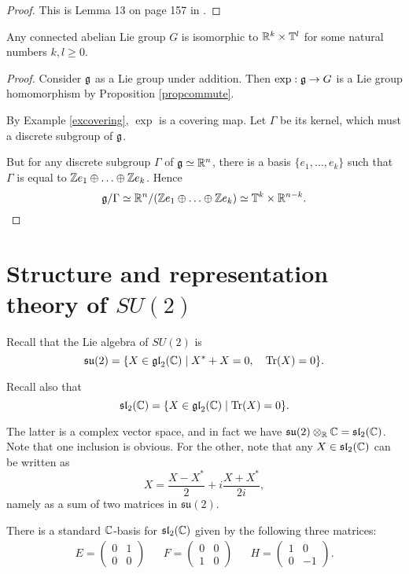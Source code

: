 \documentclass[11pt, english]{article}
\begin{document}
\begin{proof}
This is Lemma 13 on page 157 in \cite{spivak_manifolds}.
\end{proof}

\begin{prop}
\label{propabelian}
  Any connected abelian Lie group $G$ is isomorphic to $\mathbb{R}^k \times \mathbb T^l$ for some natural numbers $k,l \geq 0$.
\end{prop}

\begin{proof}
 Consider $\mathfrak g$ as a Lie group under addition. Then $\exp:\mathfrak g \to G$ is a Lie group homomorphism by Proposition \ref{propcommute}.

By Example \ref{excovering}, $\exp$ is a covering map. Let $\Gamma$ be its kernel, which must a discrete subgroup of $\mathfrak g$. 

But for any discrete subgroup $\Gamma$ of $\mathfrak g \simeq \mathbb{R}^n$, there is a basis $\{e_1,\ldots,e_k \}$ such that $\Gamma$ is equal to $\mathbb{Z} e_1 \oplus \ldots \oplus \mathbb{Z} e_k$. Hence
$$
\mathfrak g / \Gamma \simeq \mathbb{R}^n/(\mathbb{Z} e_1 \oplus \ldots \oplus \mathbb{Z} e_k) \simeq \mathbb T^k \times \mathbb{R}^{n-k}.
$$
\end{proof}



\newpage
\section{Structure and representation theory of $SU(2)$}

Recall that the Lie algebra of $SU(2)$ is
$$
\mathfrak{su}(2) = \{ X \in \mathfrak{gl}_2(\mathbb{C}) \mid X^\ast + X = 0, \quad \operatorname{Tr}(X) = 0\} .
$$

Recall also that
$$
\mathfrak{sl}_2(\mathbb{C}) = \{ X \in \mathfrak{gl}_2(\mathbb{C}) \mid \operatorname{Tr}(X) = 0 \}.
$$

The latter is a complex vector space, and in fact we have $\mathfrak{su}(2) \otimes_{\mathbb{R}} \mathbb{C} = \mathfrak{sl}_2(\mathbb{C})$. Note that one inclusion is obvious. For the other, note that any $X \in \mathfrak{sl}_2(\mathbb{C})$ can be written as 
$$
X = \frac{X-X^\ast}{2} + i \frac{X+X^\ast}{2i},
$$
namely as a sum of two matrices in $\mathfrak{su}(2)$. 

There is a standard $\mathbb{C}$-basis for $\mathfrak{sl}_2(\mathbb{C})$ given by the following three matrices:
\begin{align*}
E = \begin{pmatrix}
0 & 1 \\
0 & 0 
\end{pmatrix} &&
F = \begin{pmatrix} 
0 & 0 \\
1 & 0 
\end{pmatrix} &&
H = \begin{pmatrix}
1 & 0 \\
0 & - 1
\end{pmatrix}.
\end{align*}
\end{document}
